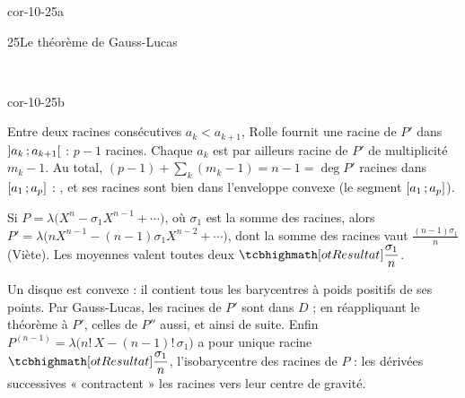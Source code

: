 \begin{blocLivre}{cor-10-25a}
\begin{corrige}{25}{Le théorème de Gauss-Lucas}
\begin{center}
\\[0.5mm]
\end{center}
\end{corrige}
\end{blocLivre}

\begin{blocLivre}{cor-10-25b}
\begin{corrigeSuite}
\begin{questions}[start=6]
  \item Entre deux racines consécutives $a_k<a_{k+1}$, Rolle fournit une
    racine de $P'$ dans $\mathopen{]}a_k\,{;}\,a_{k+1}\mathclose{[}$ : $p-1$ racines. Chaque
    $a_k$ est par ailleurs racine de $P'$ de multiplicité $m_k-1$. Au
    total, $(p-1)+\sum_k(m_k-1)=n-1=\deg P'$ racines dans
    $\mathopen{[}a_1\,{;}\,a_p\mathclose{]}$ : , et ses racines
    sont bien dans l'enveloppe convexe (le segment $\mathopen{[}a_1\,{;}\,a_p\mathclose{]}$).
\end{questions}
\begin{questions}[start=7]
  \item Si $P=\lambda\bigl(X^{n}-\sigma_1X^{n-1}+\cdots\bigr)$, où
    $\sigma_1$ est la somme des racines, alors
    $P'=\lambda\bigl(nX^{n-1}-(n-1)\sigma_1X^{n-2}+\cdots\bigr)$, dont la
    somme des racines vaut $\frac{(n-1)\sigma_1}{n}$ (Viète). Les moyennes
    valent toutes deux $\res{\dfrac{\sigma_1}{n}}$.
  \item Un disque est convexe : il contient tous les barycentres à poids
    positifs de ses points. Par Gauss-Lucas, les racines de $P'$ sont dans
    $D$ ; en réappliquant le théorème à $P'$, celles de $P''$ aussi, et
    ainsi de suite. Enfin
    $P^{(n-1)}=\lambda\bigl(n!\,X-(n-1)!\,\sigma_1\bigr)$ a pour unique
    racine $\res{\dfrac{\sigma_1}{n}}$, l'isobarycentre des racines de $P$ :
    les dérivées successives « contractent » les racines vers leur centre
    de gravité.
\end{questions}
\end{corrigeSuite}
\end{blocLivre}
